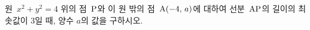 원~$x^2+y^2=4$ 위의 점~$\mathrm{P}$와 이 원 밖의 점~$\mathrm{A}(-4,\,a)$에 대하여 선분~$\mathrm{AP}$의 길이의 최솟값이 $3$일 때, 양수 $a$의 값을 구하시오.
